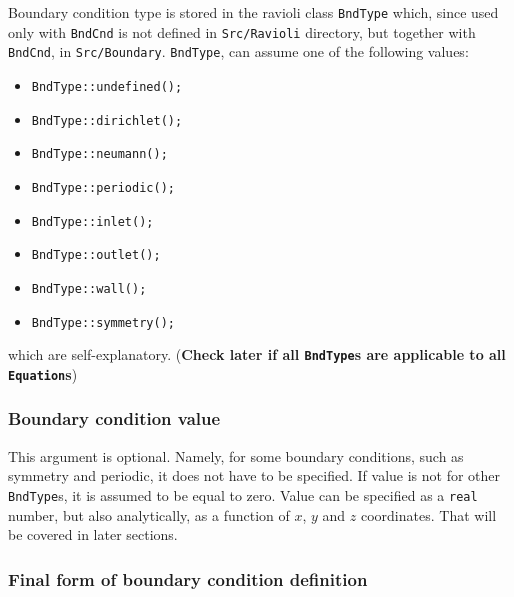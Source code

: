 Boundary condition type is stored in the ravioli class {\tt BndType} which,
since used only with {\tt BndCnd} is not defined in {\tt Src/Ravioli}
directory, but together with {\tt BndCnd}, in {\tt Src/Boundary}. 
{\tt BndType}, can assume one of the following values:
%
\begin{itemize}
  \item {\tt BndType::undefined();} 
  \item {\tt BndType::dirichlet();}
  \item {\tt BndType::neumann();}
  \item {\tt BndType::periodic();}
  \item {\tt BndType::inlet();}
  \item {\tt BndType::outlet();}
  \item {\tt BndType::wall();}
  \item {\tt BndType::symmetry();}
\end{itemize}
%
which are self-explanatory. ({\bf Check later if all {\tt BndType}s are 
applicable to all {\tt Equation}s})

\subsubsection{Boundary condition value}

This argument is optional. Namely, for some boundary conditions, such as 
symmetry and periodic, it does not have to be specified. If value is not
for other {\tt BndType}s, it is assumed to be equal to zero.
%
Value can be specified as a {\tt real} number, but also analytically,
as a function of $x$, $y$ and $z$ coordinates. That will be covered in
later sections. 

\subsubsection{Final form of boundary condition definition}

